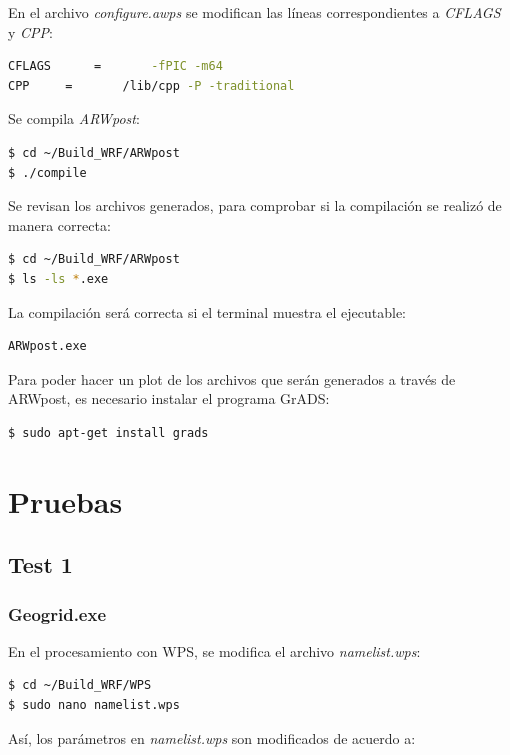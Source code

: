 \documentclass[12pt,letter]{article}
\begin{document}
\noindent En el archivo \textit{configure.awps} se modifican las l\'ineas correspondientes a \textit{CFLAGS} y \textit{CPP}:
\begin{lstlisting}[language=bash]
CFLAGS		= 		-fPIC -m64
CPP		=		/lib/cpp -P -traditional
\end{lstlisting}

\noindent Se compila \textit{ARWpost}:
\begin{lstlisting}[language=bash]
$ cd ~/Build_WRF/ARWpost
$ ./compile
\end{lstlisting}

\noindent Se revisan los archivos generados, para comprobar si la compilaci\'on se realiz\'o de manera correcta:
\begin{lstlisting}[language=bash]
$ cd ~/Build_WRF/ARWpost
$ ls -ls *.exe
\end{lstlisting}

\noindent La compilaci\'on ser\'a correcta si el terminal muestra el ejecutable:
\begin{lstlisting}[language=bash]
ARWpost.exe
\end{lstlisting}

\noindent Para poder hacer un plot de los archivos que ser\'an generados a trav\'es de ARWpost, es necesario instalar el programa GrADS:

\begin{lstlisting}
$ sudo apt-get install grads
\end{lstlisting}
\section*{Pruebas}

\subsection*{Test 1}
\subsubsection*{Geogrid.exe}
En el procesamiento con WPS, se modifica el archivo \textit{namelist.wps}:
\begin{lstlisting}[language=bash]
$ cd ~/Build_WRF/WPS
$ sudo nano namelist.wps
\end{lstlisting}

\noindent As\'i, los par\'ametros en \textit{namelist.wps} son modificados de acuerdo a:
\end{document}
